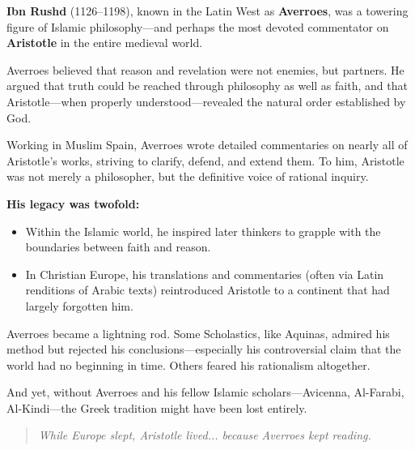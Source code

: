 \begin{tcolorbox}[colback=gray!5!white, colframe=black!75!white, title={Historical Sidebar: Averroes and the Bridge of Aristotle}]

    \textbf{Ibn Rushd} (1126–1198), known in the Latin West as \textbf{Averroes}, was a towering figure of Islamic philosophy—and perhaps the most devoted commentator on \textbf{Aristotle} in the entire medieval world.

    \medskip
    
    Averroes believed that reason and revelation were not enemies, but partners. He argued that truth could be reached through philosophy as well as faith, and that Aristotle—when properly understood—revealed the natural order established by God.

    \medskip
    
    Working in Muslim Spain, Averroes wrote detailed commentaries on nearly all of Aristotle’s works, striving to clarify, defend, and extend them. To him, Aristotle was not merely a philosopher, but the definitive voice of rational inquiry.
    
    \medskip
    
    \textbf{His legacy was twofold:}

    \medskip

    \begin{itemize}
        \item Within the Islamic world, he inspired later thinkers to grapple with the boundaries between faith and reason.
        \item In Christian Europe, his translations and commentaries (often via Latin renditions of Arabic texts) reintroduced Aristotle to a continent that had largely forgotten him.
    \end{itemize}
    
    \medskip

    Averroes became a lightning rod. Some Scholastics, like Aquinas, admired his method but rejected his conclusions—especially his controversial claim that the world had no beginning in time. Others feared his rationalism altogether.

    \medskip
    
    And yet, without Averroes and his fellow Islamic scholars—Avicenna, Al-Farabi, Al-Kindi—the Greek tradition might have been lost entirely.
    
    \begin{quote}
    \textit{While Europe slept, Aristotle lived... because Averroes kept reading.}
    \end{quote}
    
\end{tcolorbox}


